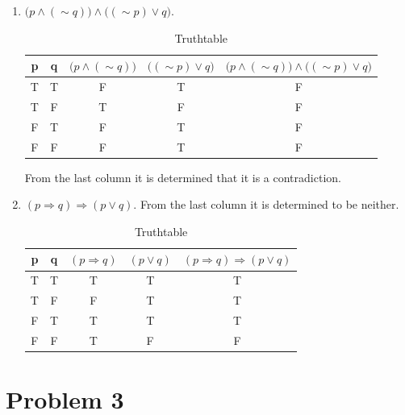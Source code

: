 \documentclass[english,10pt,a4paper]{article}
\begin{document}
\begin{enumerate}[a]
\item $\Big( p \wedge (\sim q)\Big) \wedge \Big(( \sim p) \vee q\Big) $.
\begin{table}[h]
\centering
	\begin{tabular}{c|c|c|c|c}
	\textbf{p} & \textbf{q} & \textbf{$\Big( p \wedge (\sim q)\Big)$} & \textbf{$ \Big(( \sim p) \vee q\Big) $}  & $\Big( p \wedge (\sim q)\Big) \wedge \Big(( \sim p) \vee q\Big) $\\\hline
	T & T & F & T & F\\ 	\hline
	T & F & T & F & F\\ 	\hline 
	F & T & F & T & F\\ 	\hline 
	F & F & F & T & F\\ 	\hline 
	\end{tabular}
\caption{Truthtable}
\label{tab:title}
\end{table}
From the last column it is determined that it is a contradiction.

\item $(p \Rightarrow q) \Rightarrow (p \vee q)$. From the last column it is determined to be neither.
\begin{table}[h]
\centering
	\begin{tabular}{c|c|c|c|c}
	\textbf{p} & \textbf{q} & $(p \Rightarrow q)$ & $(p \vee q)$ & $(p \Rightarrow q) \Rightarrow (p \vee q)$\\\hline
	T & T & T & T & T\\ 	\hline
	T & F & F & T & T\\ 	\hline 
	F & T & T & T & T\\ 	\hline 
	F & F & T & F & F\\ 	\hline 
	\end{tabular}
\caption{Truthtable}
\label{tab:title}
\end{table}

\end{enumerate}

\newpage
\section*{Problem 3}
\end{document}
